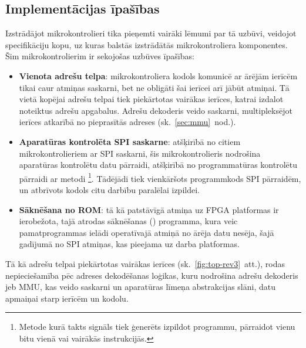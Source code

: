 \subsection{Implementācijas īpašības} \label{sec:design}
Izstrādājot mikrokontrolieri tika pieņemti vairāki lēmumi par tā uzbūvi,
veidojot specifikāciju kopu, uz kuras
balstās izstrādātās mikrokontroliera komponentes.
Šim mikrokontrolierim ir sekojošas uzbūves īpašības:
\begin{itemize}
	\item \textbf{Vienota adrešu telpa}:
		mikrokontroliera kodols komunicē ar ārējām ierīcēm tikai caur
		atmiņas saskarni, bet ne obligāti šai ierīcei arī jābūt atmiņai.
		Tā vietā kopējai adrešu telpai tiek piekārtotas vairākas ierīces,
		katrai izdalot noteiktus adrešu apgabalus. Adrešu dekoderis veido saskarni,
		multipleksējot ierīces atkarībā no pieprasītās adreses
		(sk.~\ref{sec:mmu}~nod.).\pagebreak[1]
	\item \textbf{Aparatūras kontrolēta SPI saskarne}:
		atšķirībā no citiem mikrokontrolieriem ar SPI saskarni,
		šis mikro\-kontrolieris nodrošina aparatūras kontrolētu datu pārraidi,
		atšķirībā no programmatūras kontrolētu pārraidi ar
		 metodi%
		\footnote{Metode kurā takts signāls tiek ģenerēts izpildot programmu,
			pārraidot vienu bitu vienā vai vairākās instrukcijās.}.
		Tādējādi tiek vienkāršots programmkods SPI pārraidēm, un atbrīvots
		kodols citu darbību paralēlai izpildei.
	\item \textbf{Sāknēšana no ROM}:
		tā kā patstāvīgā atmiņa uz FPGA platformas ir ierobežota, tajā
		atrodas sāknēšanas () programma,
		kura veic pamatprogrammas ielādi
		operatīvajā atmiņā no ārēja datu nesēja, šajā gadījumā no 
		SPI  atmiņas, kas pieejama uz darba platformas.
\end{itemize}

Tā kā adrešu telpai piekārtotas vairākas ierīces (sk.~\ref{fig:top-rev3}~att.),
rodas nepieciešamība pēc adreses dekodēšanas loģikas, kuru nodrošina
adrešu dekoderis jeb MMU, kas veido saskarni un 
aparatūras līmeņa abstrakcijas slāni, datu apmaiņai starp ierīcēm un kodolu.

\lipsum[24-24]
